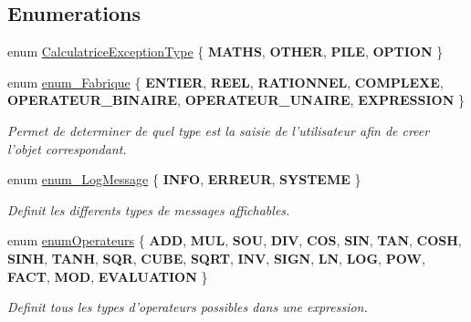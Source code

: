 \subsection*{\-Enumerations}
\begin{DoxyCompactItemize}
\item 
enum \hyperlink{namespace_l_o21_a4cea05b79a8da799daea8141505d6f59}{\-Calculatrice\-Exception\-Type} \{ {\bfseries \-M\-A\-T\-H\-S}, 
{\bfseries \-O\-T\-H\-E\-R}, 
{\bfseries \-P\-I\-L\-E}, 
{\bfseries \-O\-P\-T\-I\-O\-N}
 \}
\item 
enum \hyperlink{namespace_l_o21_acedc482cdf54c16ec5847664c2104aab}{enum\-\_\-\-Fabrique} \{ \*
{\bfseries \-E\-N\-T\-I\-E\-R}, 
{\bfseries \-R\-E\-E\-L}, 
{\bfseries \-R\-A\-T\-I\-O\-N\-N\-E\-L}, 
{\bfseries \-C\-O\-M\-P\-L\-E\-X\-E}, 
\*
{\bfseries \-O\-P\-E\-R\-A\-T\-E\-U\-R\-\_\-\-B\-I\-N\-A\-I\-R\-E}, 
{\bfseries \-O\-P\-E\-R\-A\-T\-E\-U\-R\-\_\-\-U\-N\-A\-I\-R\-E}, 
{\bfseries \-E\-X\-P\-R\-E\-S\-S\-I\-O\-N}
 \}
\begin{DoxyCompactList}\small\item\em \-Permet de determiner de quel type est la saisie de l'utilisateur afin de creer l'objet correspondant. \end{DoxyCompactList}\item 
enum \hyperlink{namespace_l_o21_a129f8d204fc6d0d79283a2cf32d833df}{enum\-\_\-\-Log\-Message} \{ {\bfseries \-I\-N\-F\-O}, 
{\bfseries \-E\-R\-R\-E\-U\-R}, 
{\bfseries \-S\-Y\-S\-T\-E\-M\-E}
 \}
\begin{DoxyCompactList}\small\item\em \-Definit les differents types de messages affichables. \end{DoxyCompactList}\item 
enum \hyperlink{namespace_l_o21_ad50ab07e90eb3964a086c2f7d95fb8d2}{enum\-Operateurs} \{ \*
{\bfseries \-A\-D\-D}, 
{\bfseries \-M\-U\-L}, 
{\bfseries \-S\-O\-U}, 
{\bfseries \-D\-I\-V}, 
\*
{\bfseries \-C\-O\-S}, 
{\bfseries \-S\-I\-N}, 
{\bfseries \-T\-A\-N}, 
{\bfseries \-C\-O\-S\-H}, 
\*
{\bfseries \-S\-I\-N\-H}, 
{\bfseries \-T\-A\-N\-H}, 
{\bfseries \-S\-Q\-R}, 
{\bfseries \-C\-U\-B\-E}, 
\*
{\bfseries \-S\-Q\-R\-T}, 
{\bfseries \-I\-N\-V}, 
{\bfseries \-S\-I\-G\-N}, 
{\bfseries \-L\-N}, 
\*
{\bfseries \-L\-O\-G}, 
{\bfseries \-P\-O\-W}, 
{\bfseries \-F\-A\-C\-T}, 
{\bfseries \-M\-O\-D}, 
\*
{\bfseries \-E\-V\-A\-L\-U\-A\-T\-I\-O\-N}
 \}
\begin{DoxyCompactList}\small\item\em \-Definit tous les types d'operateurs possibles dans une expression. \end{DoxyCompactList}\end{DoxyCompactItemize}
